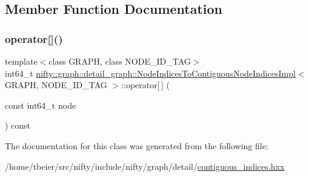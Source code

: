 \subsection{Member Function Documentation}
\mbox{\label{classnifty_1_1graph_1_1detail__graph_1_1NodeIndicesToContiguousNodeIndicesImpl_a38663dd0927fdf715d490f56b7fb3873}} 
\subsubsection{\texorpdfstring{operator[]()}{operator[]()}}
{\footnotesize\ttfamily template$<$class G\+R\+A\+PH, class N\+O\+D\+E\+\_\+\+I\+D\+\_\+\+T\+AG$>$ \\
int64\+\_\+t \hyperlink{classnifty_1_1graph_1_1detail__graph_1_1NodeIndicesToContiguousNodeIndicesImpl}{nifty\+::graph\+::detail\+\_\+graph\+::\+Node\+Indices\+To\+Contiguous\+Node\+Indices\+Impl}$<$ G\+R\+A\+PH, N\+O\+D\+E\+\_\+\+I\+D\+\_\+\+T\+AG $>$\+::operator\mbox{[}$\,$\mbox{]} (\begin{DoxyParamCaption}\item[{const int64\+\_\+t}]{node }\end{DoxyParamCaption}) const\hspace{0.3cm}{\ttfamily [inline]}}



The documentation for this class was generated from the following file\+:\begin{DoxyCompactItemize}
\item 
/home/tbeier/src/nifty/include/nifty/graph/detail/\hyperlink{contiguous__indices_8hxx}{contiguous\+\_\+indices.\+hxx}\end{DoxyCompactItemize}
